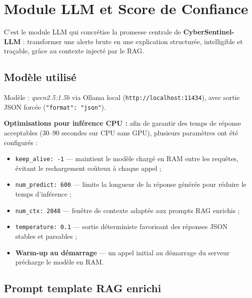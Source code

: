 \documentclass[12pt,a4paper]{report}
\begin{document}
\section{Module LLM et Score de Confiance}
\begin{onehalfspace}
C'est le module LLM qui concrétise la promesse centrale de
\textbf{CyberSentinel-LLM} : transformer une alerte brute en une explication
structurée, intelligible et traçable, grâce au contexte injecté par le RAG.

\subsection*{Modèle utilisé}
Modèle : \textit{qwen2.5:1.5b} via Ollama local (\texttt{http://localhost:11434}),
avec sortie JSON forcée (\texttt{"format": "json"}).

\begin{onehalfspace}
\textbf{Optimisations pour inférence CPU :} afin de garantir
des temps de réponse acceptables (30--90 secondes sur CPU sans GPU),
plusieurs paramètres ont été configurés :

\begin{itemize}
  \item[\ding{43}] \texttt{keep\_alive: -1} — maintient le modèle
  chargé en RAM entre les requêtes, évitant le rechargement
  coûteux à chaque appel ;
  \item[\ding{43}] \texttt{num\_predict: 600} — limite la longueur
  de la réponse générée pour réduire le temps d'inférence ;
  \item[\ding{43}] \texttt{num\_ctx: 2048} — fenêtre de contexte
  adaptée aux prompts RAG enrichis ;
  \item[\ding{43}] \texttt{temperature: 0.1} — sortie déterministe
  favorisant des réponses JSON stables et parsables ;
  \item[\ding{43}] \textbf{Warm-up au démarrage} — un appel initial
  au démarrage du serveur précharge le modèle en RAM.
\end{itemize}
\end{onehalfspace}

\subsection*{Prompt template RAG enrichi}
\end{onehalfspace}
\end{document}
